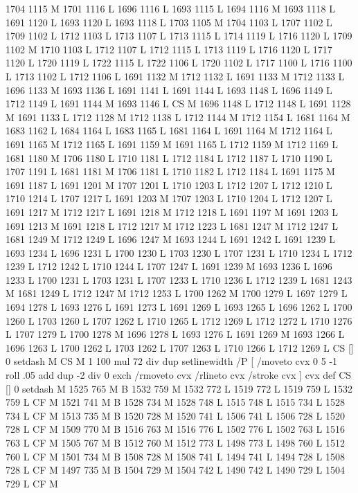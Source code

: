 {{{{{{{{{{{{{{{{{{{{{{{{{{{1704 1115 M 1701 1116 L
1696 1116 L
1693 1115 L
1694 1116 M 1693 1118 L
1691 1120 L
1693 1120 L
1693 1118 L
1703 1105 M 1704 1103 L
1707 1102 L
1709 1102 L
1712 1103 L
1713 1107 L
1713 1115 L
1714 1119 L
1716 1120 L
1709 1102 M 1710 1103 L
1712 1107 L
1712 1115 L
1713 1119 L
1716 1120 L
1717 1120 L
1720 1119 L
1722 1115 L
1722 1106 L
1720 1102 L
1717 1100 L
1716 1100 L
1713 1102 L
1712 1106 L
1691 1132 M 1712 1132 L
1691 1133 M 1712 1133 L
1696 1133 M 1693 1136 L
1691 1141 L
1691 1144 L
1693 1148 L
1696 1149 L
1712 1149 L
1691 1144 M 1693 1146 L
CS M
1696 1148 L
1712 1148 L
1691 1128 M 1691 1133 L
1712 1128 M 1712 1138 L
1712 1144 M 1712 1154 L
1681 1164 M 1683 1162 L
1684 1164 L
1683 1165 L
1681 1164 L
1691 1164 M 1712 1164 L
1691 1165 M 1712 1165 L
1691 1159 M 1691 1165 L
1712 1159 M 1712 1169 L
1681 1180 M 1706 1180 L
1710 1181 L
1712 1184 L
1712 1187 L
1710 1190 L
1707 1191 L
1681 1181 M 1706 1181 L
1710 1182 L
1712 1184 L
1691 1175 M 1691 1187 L
1691 1201 M 1707 1201 L
1710 1203 L
1712 1207 L
1712 1210 L
1710 1214 L
1707 1217 L
1691 1203 M 1707 1203 L
1710 1204 L
1712 1207 L
1691 1217 M 1712 1217 L
1691 1218 M 1712 1218 L
1691 1197 M 1691 1203 L
1691 1213 M 1691 1218 L
1712 1217 M 1712 1223 L
1681 1247 M 1712 1247 L
1681 1249 M 1712 1249 L
1696 1247 M 1693 1244 L
1691 1242 L
1691 1239 L
1693 1234 L
1696 1231 L
1700 1230 L
1703 1230 L
1707 1231 L
1710 1234 L
1712 1239 L
1712 1242 L
1710 1244 L
1707 1247 L
1691 1239 M 1693 1236 L
1696 1233 L
1700 1231 L
1703 1231 L
1707 1233 L
1710 1236 L
1712 1239 L
1681 1243 M 1681 1249 L
1712 1247 M 1712 1253 L
1700 1262 M 1700 1279 L
1697 1279 L
1694 1278 L
1693 1276 L
1691 1273 L
1691 1269 L
1693 1265 L
1696 1262 L
1700 1260 L
1703 1260 L
1707 1262 L
1710 1265 L
1712 1269 L
1712 1272 L
1710 1276 L
1707 1279 L
1700 1278 M 1696 1278 L
1693 1276 L
1691 1269 M 1693 1266 L
1696 1263 L
1700 1262 L
1703 1262 L
1707 1263 L
1710 1266 L
1712 1269 L
CS [] 0 setdash M
CS M 1 100 mul 72 div dup setlinewidth
/P [ /moveto cvx 0 5 -1 roll .05 add dup -2 div 0 exch /rmoveto cvx /rlineto cvx /stroke cvx ] cvx def
CS [] 0 setdash M
1525 765 M B
1532 759 M 1532 772 L
1519 772 L
1519 759 L
1532 759 L
CF M
1521 741 M B
1528 734 M 1528 748 L
1515 748 L
1515 734 L
1528 734 L
CF M
1513 735 M B
1520 728 M 1520 741 L
1506 741 L
1506 728 L
1520 728 L
CF M
1509 770 M B
1516 763 M 1516 776 L
1502 776 L
1502 763 L
1516 763 L
CF M
1505 767 M B
1512 760 M 1512 773 L
1498 773 L
1498 760 L
1512 760 L
CF M
1501 734 M B
1508 728 M 1508 741 L
1494 741 L
1494 728 L
1508 728 L
CF M
1497 735 M B
1504 729 M 1504 742 L
1490 742 L
1490 729 L
1504 729 L
CF M
}}}}}}}}}}}}}}}}}}}}}}}}}}}
